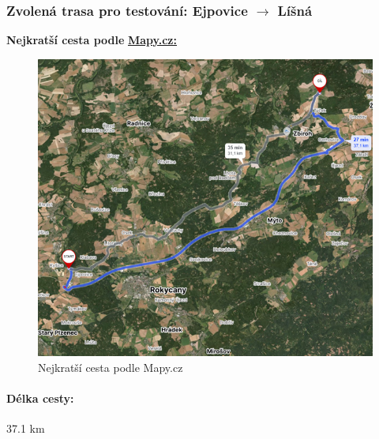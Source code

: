 \subsubsection{Zvolená trasa pro testování: Ejpovice \texorpdfstring{\(\rightarrow\)}{->} Líšná}
\textbf{Nejkratší cesta podle} \href{https://mapy.cz/letecka?planovani-trasy&rc=9eWmCxWBAS9f688xWodt&rs=pubt&rs=muni&ri=15211331&ri=1492&mrp=%7B%22c%22%3A111%7D&xc=%5B%5D&rwp=1%3B9eZV9xVy8T9egA7kAX9e71I5Yj9evYfm8B9fBcjif3kovk.UlKVxW1xomJ9kK-bZ7xW7Gi&rut=1&x=13.6700184&y=49.8084302&z=11}{\textbf{Mapy.cz:}}
\newpage
\begin{figure}[H]
    \centering
    \includegraphics[width=\textwidth]{images/Shortest_path_mapy_cz_2.png}
    \caption{Nejkratší cesta podle Mapy.cz}
\end{figure}
\paragraph{Délka cesty:} 37.1 km

